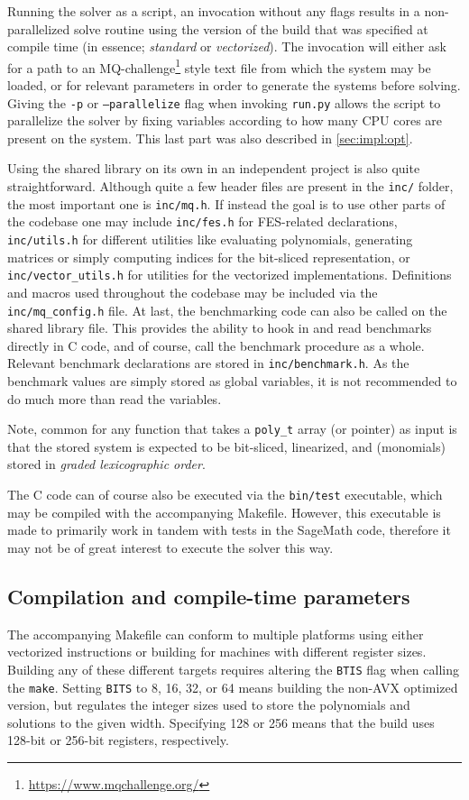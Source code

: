 Running the solver as a script, an invocation without any flags results in a non-parallelized solve routine using the version of the build that was specified at compile time (in essence; \textit{standard} or \textit{vectorized}). The invocation will either ask for a path to an MQ-challenge\footnote{\url{https://www.mqchallenge.org/}} style text file from which the system may be loaded, or for relevant parameters in order to generate the systems before solving. Giving the \texttt{-p} or \texttt{--parallelize} flag when invoking \texttt{run.py} allows the script to parallelize the solver by fixing variables according to how many CPU cores are present on the system. This last part was also described in \cref{sec:impl:opt}.

Using the shared library on its own in an independent project is also quite straightforward. Although quite a few header files are present in the \texttt{inc/} folder, the most important one is \texttt{inc/mq.h}. If instead the goal is to use other parts of the codebase one may include \texttt{inc/fes.h} for FES-related declarations, \texttt{inc/utils.h} for different utilities like evaluating polynomials, generating matrices or simply computing indices for the bit-sliced representation, or \texttt{inc/vector\_utils.h} for utilities for the vectorized implementations. Definitions and macros used throughout the codebase may be included via the \texttt{inc/mq\_config.h} file. At last, the benchmarking code can also be called on the shared library file. This provides the ability to hook in and read benchmarks directly in C code, and of course, call the benchmark procedure as a whole. Relevant benchmark declarations are stored in \texttt{inc/benchmark.h}. As the benchmark values are simply stored as global variables, it is not recommended to do much more than read the variables. 

Note, common for any function that takes a \texttt{poly\_t} array (or pointer) as input is that the stored system is expected to be bit-sliced, linearized, and (monomials) stored in \textit{graded lexicographic order}.

The C code can of course also be executed via the \texttt{bin/test} executable, which may be compiled with the accompanying Makefile. However, this executable is made to primarily work in tandem with tests in the SageMath code, therefore it may not be of great interest to execute the solver this way.

\subsection{Compilation and compile-time parameters} \label{sec:impl:compile}
The accompanying Makefile can conform to multiple platforms using either vectorized instructions or building for machines with different register sizes. Building any of these different targets requires altering the \texttt{BTIS} flag when calling the \texttt{make}. Setting \texttt{BITS} to 8, 16, 32, or 64 means building the non-AVX optimized version, but regulates the integer sizes used to store the polynomials and solutions to the given width. Specifying 128 or 256 means that the build uses 128-bit or 256-bit registers, respectively. 

